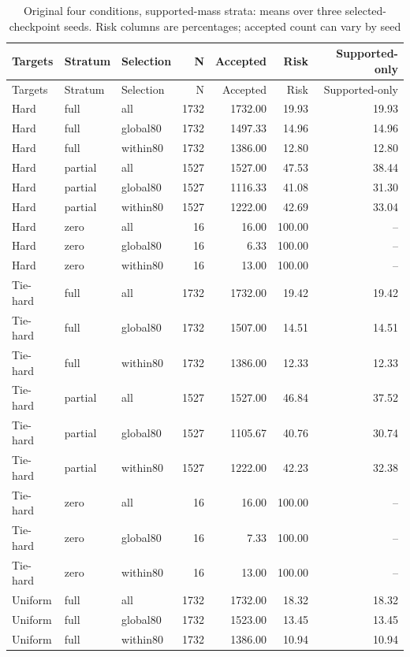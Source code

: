 \documentclass[10pt]{article}
\begin{document}
\begin{longtable}{lllrrrr}
\caption{Original four conditions, supported-mass strata: means over three selected-checkpoint seeds. Risk columns are percentages; accepted count can vary by seed}\\
\toprule Targets & Stratum & Selection & N & Accepted & Risk & Supported-only\\\midrule\endfirsthead
\toprule Targets & Stratum & Selection & N & Accepted & Risk & Supported-only\\\midrule\endhead
Hard & full & all & 1732 & 1732.00 & 19.93 & 19.93\\
Hard & full & global80 & 1732 & 1497.33 & 14.96 & 14.96\\
Hard & full & within80 & 1732 & 1386.00 & 12.80 & 12.80\\
Hard & partial & all & 1527 & 1527.00 & 47.53 & 38.44\\
Hard & partial & global80 & 1527 & 1116.33 & 41.08 & 31.30\\
Hard & partial & within80 & 1527 & 1222.00 & 42.69 & 33.04\\
Hard & zero & all & 16 & 16.00 & 100.00 & --\\
Hard & zero & global80 & 16 & 6.33 & 100.00 & --\\
Hard & zero & within80 & 16 & 13.00 & 100.00 & --\\
\addlinespace
Tie-hard & full & all & 1732 & 1732.00 & 19.42 & 19.42\\
Tie-hard & full & global80 & 1732 & 1507.00 & 14.51 & 14.51\\
Tie-hard & full & within80 & 1732 & 1386.00 & 12.33 & 12.33\\
Tie-hard & partial & all & 1527 & 1527.00 & 46.84 & 37.52\\
Tie-hard & partial & global80 & 1527 & 1105.67 & 40.76 & 30.74\\
Tie-hard & partial & within80 & 1527 & 1222.00 & 42.23 & 32.38\\
Tie-hard & zero & all & 16 & 16.00 & 100.00 & --\\
Tie-hard & zero & global80 & 16 & 7.33 & 100.00 & --\\
Tie-hard & zero & within80 & 16 & 13.00 & 100.00 & --\\
\addlinespace
Uniform & full & all & 1732 & 1732.00 & 18.32 & 18.32\\
Uniform & full & global80 & 1732 & 1523.00 & 13.45 & 13.45\\
Uniform & full & within80 & 1732 & 1386.00 & 10.94 & 10.94\\

\end{longtable}
\end{document}
